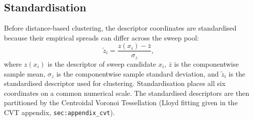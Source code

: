 \subsection*{Standardisation}

Before distance-based clustering, the descriptor coordinates are standardised
because their empirical spreads can differ across the sweep pool:
\[
\tilde z_i=\frac{z(x_i)-\bar z}{\sigma_z},
\]
where $z(x_i)$ is the descriptor of sweep candidate $x_i$, $\bar z$ is the
componentwise sample mean, $\sigma_z$ is the componentwise sample standard
deviation, and $\tilde z_i$ is the standardised descriptor used for
clustering. Standardisation places all six coordinates on a common numerical
scale. The standardised descriptors are then partitioned by the Centroidal
Voronoi Tessellation (Lloyd fitting given in the CVT appendix,
\texttt{sec:appendix\_cvt}).

